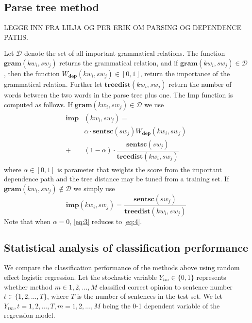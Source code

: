 \documentclass[11pt]{article}
\begin{document}
\subsection{Parse tree method}
\label{sec:dp}

LEGGE INN FRA LILJA OG PER ERIK OM PARSING OG DEPENDENCE PATHS.

Let $\mathcal{D}$ denote the set of all important grammatical relations. The function $\mathbf{gram}(kw_i, sw_{j})$ returns the grammatical relation, and if $\mathbf{gram}(kw_i, sw_{j}) \in \mathcal{D}$, then the function $W_{\mathbf{dep}}(kw_i, sw_{j}) \in [0,1]$, return the importance of the grammatical relation. Further let $\mathbf{treedist}(kw_i, sw_{j})$ return the number of words between the two words in the parse tree plus one. The Imp function is computed as follows. If $\mathbf{gram}(kw_i, sw_{j}) \in \mathcal{D}$ we use
\begin{align}
  \begin{split}
    \label{eq:3}
  \mathbf{imp}&(kw_i, sw_{j}) = \\
  &\alpha \cdot \mathbf{sentsc}(sw_{j}) W_{\mathbf{dep}}(kw_i, sw_{j}) \\
  +&(1 - \alpha) \cdot \dfrac{\mathbf{sentsc}(sw_{j})}{\mathbf{treedist}(kw_i, sw_{j})}    
  \end{split}
\end{align}
where $\alpha \in [0,1]$ is parameter that weights the score from the important dependence path and the tree distance may be tuned from a training set. If $\mathbf{gram}(kw_i, sw_{j}) \not\in \mathcal{D}$ we simply use 
\begin{equation}
  \label{eq:4}
  \mathbf{imp}(kw_i, sw_{j}) = \dfrac{\mathbf{sentsc}(sw_{j})}{\mathbf{treedist}(kw_i, sw_{j})}    
\end{equation}
Note that when $\alpha = 0$, \eqref{eq:3} reduces to \eqref{eq:4}.

\subsection{Statistical analysis of classification performance}

We compare the classification performance of the methods above using random effect logistic regression. Let the stochastic variable $Y_{tm} \in \{0,1\}$ represents whether method $m \in 1,2,\ldots,M$ classified correct opinion to sentence number $t \in \{1,2,\ldots,T\}$, where $T$ is the number of sentences in the test set. We let $Y_{tm}, t = 1,2,\ldots,T, m = 1,2,\ldots,M$ being the 0-1 dependent variable of the regression model. 
\end{document}
